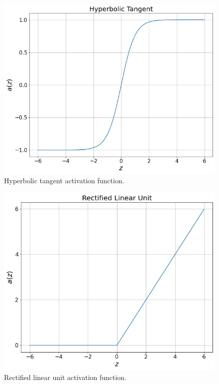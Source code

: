 \documentclass[preprint,12pt]{elsarticle}
\begin{document}
\begin{figure}
	\centering
		\includegraphics[scale=.25]{fig_activation_functions_tanh.png}
	\caption{Hyperbolic tangent activation function.}
	\label{fig_activation_functions_tanh}
\end{figure}

\begin{figure}
	\centering
		\includegraphics[scale=.25]{fig_activation_functions_relu.png}
	\caption{Rectified linear unit activation function.}
	\label{fig_activation_functions_relu}
\end{figure}
\end{document}
